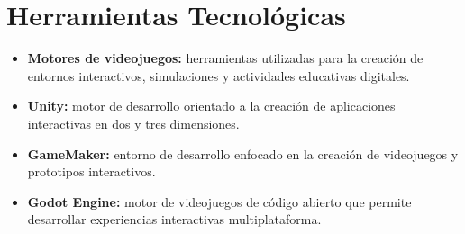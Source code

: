 \newpage
\section{Herramientas Tecnológicas}

\begin{itemize}
    \item \textbf{Motores de videojuegos:} herramientas utilizadas para la creación de entornos interactivos, simulaciones y actividades educativas digitales.

    \item \textbf{Unity:} motor de desarrollo orientado a la creación de aplicaciones interactivas en dos y tres dimensiones.

    \item \textbf{GameMaker:} entorno de desarrollo enfocado en la creación de videojuegos y prototipos interactivos.

    \item \textbf{Godot Engine:} motor de videojuegos de código abierto que permite desarrollar experiencias interactivas multiplataforma.
\end{itemize}
